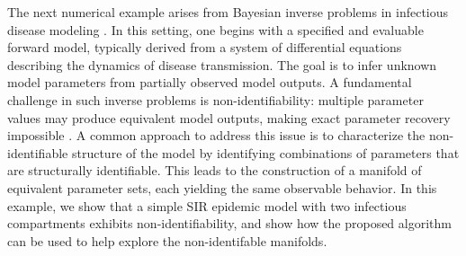 \documentclass[12pt]{article}
\begin{document}
The next numerical example arises from Bayesian inverse problems in infectious disease modeling \citep{J3, J8}. In this setting, one begins with a specified and evaluable forward model, typically derived from a system of differential equations describing the dynamics of disease transmission. The goal is to infer unknown model parameters from partially observed model outputs.
A fundamental challenge in such inverse problems is non-identifiability: multiple parameter values may produce equivalent model outputs, making exact parameter recovery impossible \citep{J14}. A common approach to address this issue is to characterize the non-identifiable structure of the model by identifying combinations of parameters that are structurally identifiable. This leads to the construction of a manifold of equivalent parameter sets, each yielding the same observable behavior. 
In this example, we show that a simple SIR epidemic model with two infectious compartments exhibits non-identifiability, and show how the proposed algorithm can be used to help explore the non-identifable manifolds.
\end{document}
